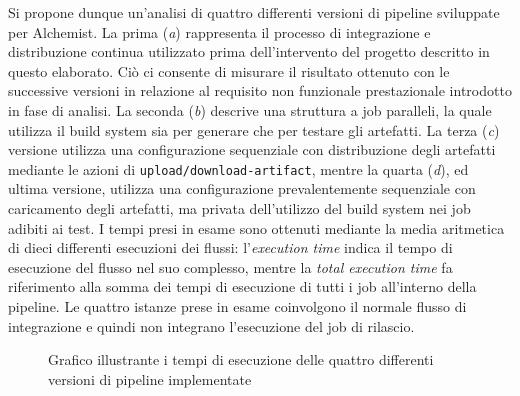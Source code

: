 Si propone dunque un'analisi di quattro differenti versioni di pipeline sviluppate per Alchemist. La prima (\textit{a}) rappresenta il processo di integrazione e distribuzione continua utilizzato prima dell'intervento del progetto descritto in questo elaborato. Ciò ci consente di misurare il risultato ottenuto con le successive versioni in relazione al requisito non funzionale prestazionale introdotto in fase di analisi. La seconda (\textit{b}) descrive una struttura a job paralleli, la quale utilizza il build system sia per generare che per testare gli artefatti. La terza (\textit{c}) versione utilizza una configurazione sequenziale con distribuzione degli artefatti mediante le azioni di \texttt{upload/download-artifact}, mentre la quarta (\textit{d}), ed ultima versione, utilizza una configurazione prevalentemente sequenziale con caricamento degli artefatti, ma privata dell'utilizzo del build system nei job adibiti ai test. I tempi presi in esame sono ottenuti mediante la media aritmetica di dieci differenti esecuzioni dei flussi: l'\textit{execution time} indica il tempo di esecuzione del flusso nel suo complesso, mentre la \textit{total execution time} fa riferimento alla somma dei tempi di esecuzione di tutti i job all'interno della pipeline. Le quattro istanze prese in esame coinvolgono il normale flusso di integrazione e quindi non integrano l'esecuzione del job di rilascio.

\begin{figure}[htb]
	\centering
	\caption{Grafico illustrante i tempi di esecuzione delle quattro differenti versioni di pipeline implementate}
	\label{fig:histogram}
\end{figure}
 
